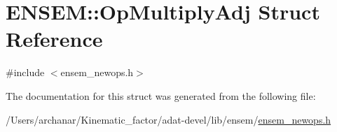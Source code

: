 \hypertarget{structENSEM_1_1OpMultiplyAdj}{}\section{E\+N\+S\+EM\+:\+:Op\+Multiply\+Adj Struct Reference}
\label{structENSEM_1_1OpMultiplyAdj}


{\ttfamily \#include $<$ensem\+\_\+newops.\+h$>$}



The documentation for this struct was generated from the following file\+:\begin{DoxyCompactItemize}
\item 
/\+Users/archanar/\+Kinematic\+\_\+factor/adat-\/devel/lib/ensem/\mbox{\hyperlink{adat-devel_2lib_2ensem_2ensem__newops_8h}{ensem\+\_\+newops.\+h}}\end{DoxyCompactItemize}
